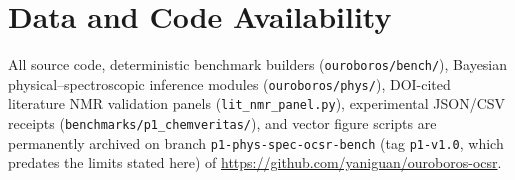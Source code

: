\documentclass[10pt,twocolumn]{article}
\begin{document}
\section*{Data and Code Availability}
All source code, deterministic benchmark builders (\texttt{ouroboros/bench/}), Bayesian physical--spectroscopic inference modules (\texttt{ouroboros/phys/}), DOI-cited literature NMR validation panels (\texttt{lit\_nmr\_panel.py}), experimental JSON/CSV receipts (\texttt{benchmarks/p1\_chemveritas/}), and vector figure scripts are permanently archived on branch \texttt{p1-phys-spec-ocsr-bench} (tag \texttt{p1-v1.0}, which predates the limits stated here) of \url{https://github.com/yaniguan/ouroboros-ocsr}.



\end{document}
